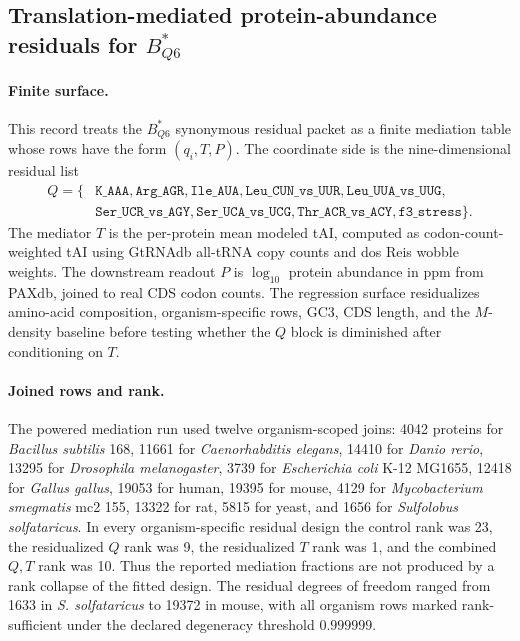 \subsection{Translation-mediated protein-abundance residuals for $B^{\ast}_{Q6}$}\label{sec:q6-translation-mediated-protein-abundance-cross-layer}

\paragraph{Finite surface.}
This record treats the $B^{\ast}_{Q6}$ synonymous residual packet as a finite mediation table whose rows have the form $(q_i,T,P)$.  The coordinate side is the nine-dimensional residual list
$$
\begin{aligned}
Q=\{&\texttt{K\_AAA},\texttt{Arg\_AGR},\texttt{Ile\_AUA},\texttt{Leu\_CUN\_vs\_UUR},\texttt{Leu\_UUA\_vs\_UUG},\\
&\texttt{Ser\_UCR\_vs\_AGY},\texttt{Ser\_UCA\_vs\_UCG},\texttt{Thr\_ACR\_vs\_ACY},\texttt{f3\_stress}\}.
\end{aligned}
$$
The mediator $T$ is the per-protein mean modeled tAI, computed as codon-count-weighted tAI using GtRNAdb all-tRNA copy counts and dos Reis wobble weights.  The downstream readout $P$ is $\log_{10}$ protein abundance in ppm from PAXdb, joined to real CDS codon counts.  The regression surface residualizes amino-acid composition, organism-specific rows, GC3, CDS length, and the $M$-density baseline before testing whether the $Q$ block is diminished after conditioning on $T$.

\paragraph{Joined rows and rank.}
The powered mediation run used twelve organism-scoped joins: 4042 proteins for \emph{Bacillus subtilis} 168, 11661 for \emph{Caenorhabditis elegans}, 14410 for \emph{Danio rerio}, 13295 for \emph{Drosophila melanogaster}, 3739 for \emph{Escherichia coli} K-12 MG1655, 12418 for \emph{Gallus gallus}, 19053 for human, 19395 for mouse, 4129 for \emph{Mycobacterium smegmatis} mc2 155, 13322 for rat, 5815 for yeast, and 1656 for \emph{Sulfolobus solfataricus}.  In every organism-specific residual design the control rank was 23, the residualized $Q$ rank was 9, the residualized $T$ rank was 1, and the combined $Q,T$ rank was 10.  Thus the reported mediation fractions are not produced by a rank collapse of the fitted design.  The residual degrees of freedom ranged from 1633 in \emph{S. solfataricus} to 19372 in mouse, with all organism rows marked rank-sufficient under the declared degeneracy threshold $0.999999$.

